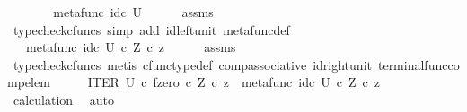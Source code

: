 \begin{isabellebody}
\ \ \isamarkupfalse%
\ \isamarkupfalse%
\ {\isachardoublequoteopen}{\isachardot}{\kern0pt}{\isachardot}{\kern0pt}{\isachardot}{\kern0pt}\ {\isacharequal}{\kern0pt}\ {\isacharparenleft}{\kern0pt}metafunc\ {\isacharparenleft}{\kern0pt}id\isactrlsub c\ U{\isacharparenright}{\kern0pt}{\isacharparenright}{\kern0pt}{\isachardoublequoteclose}\isanewline
\ \ \ \ \isamarkupfalse%
\ assms\ \isamarkupfalse%
\ {\isacharparenleft}{\kern0pt}typecheck{\isacharunderscore}{\kern0pt}cfuncs{\isacharcomma}{\kern0pt}\ simp\ add{\isacharcolon}{\kern0pt}\ id{\isacharunderscore}{\kern0pt}left{\isacharunderscore}{\kern0pt}unit{}\ metafunc{\isacharunderscore}{\kern0pt}def{}{\isacharparenright}{\kern0pt}\isanewline
\ \ \isamarkupfalse%
\ \isamarkupfalse%
\ {\isachardoublequoteopen}{\isachardot}{\kern0pt}{\isachardot}{\kern0pt}{\isachardot}{\kern0pt}\ {\isacharequal}{\kern0pt}\ {\isacharparenleft}{\kern0pt}metafunc\ {\isacharparenleft}{\kern0pt}id\isactrlsub c\ U{\isacharparenright}{\kern0pt}\ {\isasymcirc}\isactrlsub c\ {\isasymbeta}\isactrlbsub Z\isactrlesub {\isacharparenright}{\kern0pt}\ {\isasymcirc}\isactrlsub c\ z{\isachardoublequoteclose}\isanewline
\ \ \ \ \isamarkupfalse%
\ assms\ \isamarkupfalse%
\ {\isacharparenleft}{\kern0pt}typecheck{\isacharunderscore}{\kern0pt}cfuncs{\isacharcomma}{\kern0pt}\ metis\ cfunc{\isacharunderscore}{\kern0pt}type{\isacharunderscore}{\kern0pt}def\ comp{\isacharunderscore}{\kern0pt}associative\ id{\isacharunderscore}{\kern0pt}right{\isacharunderscore}{\kern0pt}unit{}\ terminal{\isacharunderscore}{\kern0pt}func{\isacharunderscore}{\kern0pt}comp{\isacharunderscore}{\kern0pt}elem{\isacharparenright}{\kern0pt}\isanewline
\ \ \isamarkupfalse%
\ \isamarkupfalse%
\ {\isachardoublequoteopen}{\isacharparenleft}{\kern0pt}ITER\ U\ {\isasymcirc}\isactrlsub c\ {\isasymlangle}f{\isacharcomma}{\kern0pt}zero\ {\isasymcirc}\isactrlsub c\ {\isasymbeta}\isactrlbsub Z\isactrlesub {\isasymrangle}{\isacharparenright}{\kern0pt}\ {\isasymcirc}\isactrlsub c\ z\ {\isacharequal}{\kern0pt}\ {\isacharparenleft}{\kern0pt}metafunc\ {\isacharparenleft}{\kern0pt}id\isactrlsub c\ U{\isacharparenright}{\kern0pt}\ {\isasymcirc}\isactrlsub c\ {\isasymbeta}\isactrlbsub Z\isactrlesub {\isacharparenright}{\kern0pt}\ {\isasymcirc}\isactrlsub c\ z{\isachardoublequoteclose}\isanewline
\ \ \ \ \isamarkupfalse%
\ calculation\ \isamarkupfalse%
\ auto\isanewline

\end{isabellebody}
